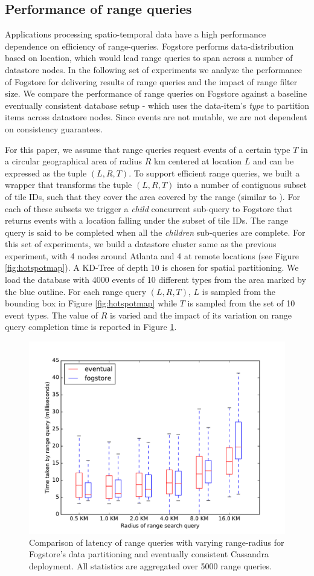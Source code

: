 \subsection{Performance of range queries}
Applications processing spatio-temporal data have a high performance dependence on efficiency of range-queries. Fogstore performs data-distribution based on location, which would lead range queries to span across a number of datastore nodes. In the following set of experiments we analyze the performance of Fogstore for delivering results of range queries and the impact of range filter size. We compare the performance of range queries on Fogstore against a baseline eventually consistent database setup - which uses the data-item's \emph{type} to partition items across datastore nodes. Since events are not mutable, we are not dependent on consistency guarantees.
\par For this paper, we assume that range queries request events of a certain type $T$ in a circular geographical area of radius $R$ km centered at location $L$ and can be expressed as the tuple $(L, R, T)$. To support efficient range queries, we built a wrapper that transforms the tuple $(L, R, T)$ into a number of contiguous subset of tile IDs, such that they cover the area covered by the range (similar to \cite{spatialcassandra}). For each of these subsets we trigger a \emph{child} concurrent sub-query to Fogstore that returns events with a location falling under the subset of tile IDs. The range query is said to be completed when all the \emph{children} sub-queries are complete. For this set of experiments, we build a datastore cluster same as the previous experiment, with 4 nodes around Atlanta and 4 at remote locations (see Figure \ref{fig:hotspotmap}). A KD-Tree of depth 10 is chosen for spatial partitioning. We load the database with 4000 events of 10 different types from the area marked by the blue outline. For each range query $(L, R, T)$, $L$ is sampled from the bounding box in Figure \ref{fig:hotspotmap} while $T$ is sampled from the set of 10 event types. The value of $R$ is varied and the impact of its variation on range query completion time is reported in Figure \ref{fig:scan}. 
\begin{figure}[h]
\centering
\includegraphics[width=0.75\columnwidth]{figures/fogstore/evals/scan/compWithEventual.pdf}
\caption{Comparison of latency of range queries with varying range-radius for Fogstore's data partitioning and eventually consistent Cassandra deployment. All statistics are aggregated over 5000 range queries.}
\label{fig:scan}
\end{figure}
